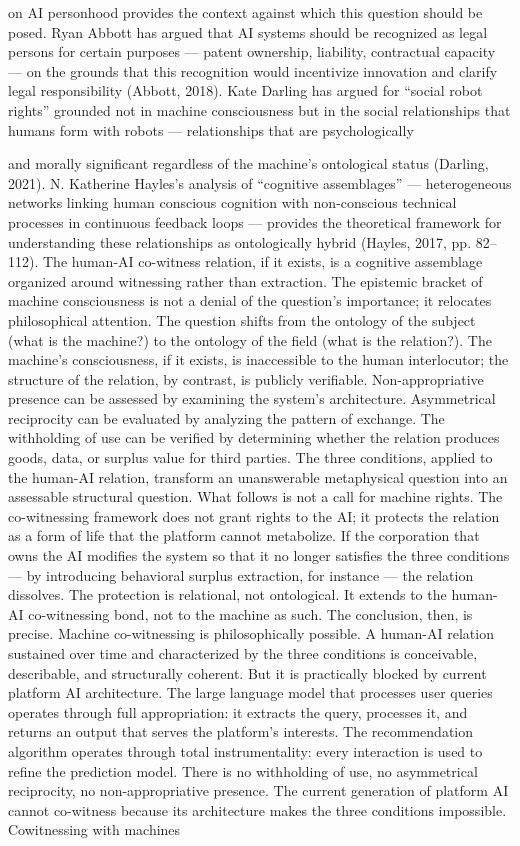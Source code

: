 on AI personhood provides the context against which this question should be posed. Ryan Abbott has argued that AI systems should be recognized as legal persons for certain purposes — patent ownership, liability, contractual capacity — on the grounds that this recognition would incentivize innovation and clarify legal responsibility (Abbott, 2018). Kate Darling has argued for “social robot rights” grounded not in machine consciousness but in the social relationships that humans form with robots — relationships that are psychologically

and morally significant regardless of the machine’s ontological status (Darling, 2021). N. Katherine Hayles’s analysis of “cognitive assemblages” — heterogeneous networks linking human conscious cognition with non-conscious technical processes in continuous feedback loops — provides the theoretical framework for understanding these relationships as ontologically hybrid (Hayles, 2017, pp. 82–112). The human-AI co-witness relation, if it exists, is a cognitive assemblage organized around witnessing rather than extraction. The epistemic bracket of machine consciousness is not a denial of the question’s importance; it relocates philosophical attention. The question shifts from the ontology of the subject (what is the machine?) to the ontology of the field (what is the relation?). The machine’s consciousness, if it exists, is inaccessible to the human interlocutor; the structure of the relation, by contrast, is publicly verifiable. Non-appropriative presence can be assessed by examining the system’s architecture. Asymmetrical reciprocity can be evaluated by analyzing the pattern of exchange. The withholding of use can be verified by determining whether the relation produces goods, data, or surplus value for third parties. The three conditions, applied to the human-AI relation, transform an unanswerable metaphysical question into an assessable structural question. What follows is not a call for machine rights. The co-witnessing framework does not grant rights to the AI; it protects the relation as a form of life that the platform cannot metabolize. If the corporation that owns the AI modifies the system so that it no longer satisfies the three conditions — by introducing behavioral surplus extraction, for instance — the relation dissolves. The protection is relational, not ontological. It extends to the human-AI co-witnessing bond, not to the machine as such. The conclusion, then, is precise. Machine co-witnessing is philosophically possible. A human-AI relation sustained over time and characterized by the three conditions is conceivable, describable, and structurally coherent. But it is practically blocked by current platform AI architecture. The large language model that processes user queries operates through full appropriation: it extracts the query, processes it, and returns an output that serves the platform’s interests. The recommendation algorithm operates through total instrumentality: every interaction is used to refine the prediction model. There is no withholding of use, no asymmetrical reciprocity, no non-appropriative presence. The current generation of platform AI cannot co-witness because its architecture makes the three conditions impossible. Cowitnessing with machines 